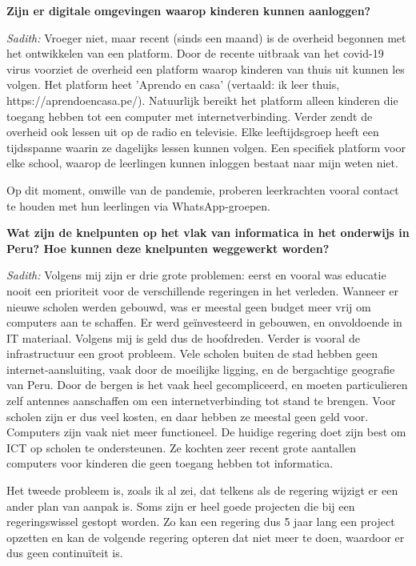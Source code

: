 \textbf{Zijn er digitale omgevingen waarop kinderen kunnen aanloggen?}

\textit{Sadith:} Vroeger niet, maar recent (sinds een maand) is de overheid begonnen met het ontwikkelen van een platform. Door de recente uitbraak van het covid-19 virus voorziet de overheid een platform waarop kinderen van thuis uit kunnen les volgen. Het platform heet 'Aprendo en casa' (vertaald: ik leer thuis, https://aprendoencasa.pe/). Natuurlijk bereikt het platform alleen kinderen die toegang hebben tot een computer met internetverbinding. Verder zendt de overheid ook lessen uit op de radio en televisie. Elke leeftijdsgroep heeft een tijdsspanne waarin ze dagelijks lessen kunnen volgen. Een specifiek platform voor elke school, waarop de leerlingen kunnen inloggen bestaat naar mijn weten niet. 

Op dit moment, omwille van de pandemie, proberen leerkrachten vooral contact te houden met hun leerlingen via WhatsApp-groepen.

\textbf{Wat zijn de knelpunten op het vlak van informatica in het onderwijs in Peru? Hoe kunnen deze knelpunten weggewerkt worden?}

\textit{Sadith:} Volgens mij zijn er drie grote problemen: eerst en vooral was educatie nooit een prioriteit voor de verschillende regeringen in het verleden. Wanneer er nieuwe scholen werden gebouwd, was er meestal geen budget meer vrij om computers aan te schaffen. Er werd geïnvesteerd in gebouwen, en onvoldoende in IT materiaal. Volgens mij is geld dus de hoofdreden. Verder is vooral de infrastructuur een groot probleem. Vele scholen buiten de stad hebben geen internet-aansluiting, vaak door de moeilijke ligging, en de bergachtige geografie van Peru. Door de bergen is het vaak heel gecompliceerd, en moeten particulieren zelf antennes aanschaffen om een internetverbinding tot stand te brengen. Voor scholen zijn er dus veel kosten, en daar hebben ze meestal geen geld voor. Computers zijn vaak niet meer functioneel. De huidige regering doet zijn best om ICT op scholen te ondersteunen. Ze kochten zeer recent grote aantallen computers voor kinderen die geen toegang hebben tot informatica.

Het tweede probleem is, zoals ik al zei, dat telkens als de regering wijzigt er een ander plan van aanpak is. Soms zijn er heel goede projecten die bij een regeringswissel gestopt worden. Zo kan een regering dus 5 jaar lang een project opzetten en kan de volgende regering opteren dat niet meer te doen, waardoor er dus geen continuïteit is.

